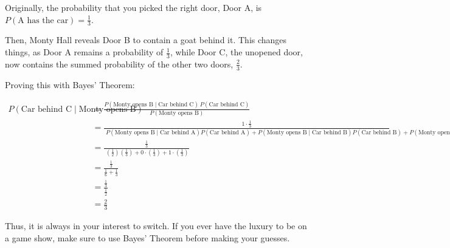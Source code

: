 Originally, the probability that you picked the right door, Door A, is $P(\text{A has the car}) = \frac{1}{3}$. 

Then, Monty Hall reveals Door B to contain a goat behind it. This changes things, as Door A remains a probability of $\frac{1}{3}$, while Door C, the unopened door, now contains the summed probability of the other two doors, $\frac{2}{3}$.

Proving this with Bayes' Theorem:

\begin{align*}
P(\text{Car behind C} \mid \text{Monty opens B}) 
&= \frac{P(\text{Monty opens B} \mid \text{Car behind C}) \, P(\text{Car behind C})}
         {P(\text{Monty opens B})} \\[6pt]
&= \frac{1 \cdot \tfrac{1}{3}}
         {\;P(\text{Monty opens B} \mid \text{Car behind A})P(\text{Car behind A}) 
         + P(\text{Monty opens B} \mid \text{Car behind B})P(\text{Car behind B}) 
         + P(\text{Monty opens B} \mid \text{Car behind C})P(\text{Car behind C})} \\[6pt]
&= \frac{\tfrac{1}{3}}
         {\;(\tfrac{1}{2})(\tfrac{1}{3}) + 0\cdot(\tfrac{1}{3}) + 1\cdot(\tfrac{1}{3})} \\[6pt]
&= \frac{\tfrac{1}{3}}{\tfrac{1}{6} + \tfrac{1}{3}} \\[6pt]
&= \frac{\tfrac{1}{3}}{\tfrac{1}{2}} \\[6pt]
&= \tfrac{2}{3}
\end{align*}

Thus, it is always in your interest to switch. If you ever have the luxury to be on a game show, make sure to use Bayes' Theorem before making your guesses. 